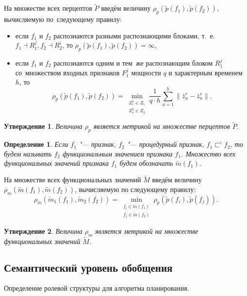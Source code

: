 \documentclass[a4paper, 12pt]{article}
\theoremstyle{plain}
\newtheorem{Pred}{Утверждение}
\newtheorem{Def}{Определение}
\begin{document}
		На множестве всех перцептов $\tilde P$ введём величину $\rho_p(\tilde p(f_1),\tilde p(f_2))$, вычисляемую по~следующему правилу:
		\begin{itemize}
			\item если $f_1$ и $f_2$ распознаются разными распознающими блоками, т.~е. $f_1\dashv R_1^j, f_2\dashv R_2^i$, то $\rho_p(\tilde p(f_1),\tilde p(f_2))=\infty$,
			\item если $f_1$ и $f_2$ распознаются одним и тем~же распознающим блоком $R_1^j$ со~множеством входных признаков $F_1^j$ мощности $q$ и характерным временем $h$, то
			\begin{equation}
				\rho_p(\tilde p(f_1),\tilde p(f_2))=\min\limits_{\substack{Z_r^1\in Z_1\\Z_s^2\in Z_2}}\frac{1}{q\cdot h}\sum\limits_{u=1}^h\|\bar z_u^r-\bar z_u^s\|.
			\end{equation} 
		\end{itemize}
		
		\begin{Pred}
			Величина $\rho_p$ является метрикой на множестве перцептов $\tilde P$.
		\end{Pred}
		
		\begin{Def}
			Если $f_1$ "--- признак, $f_2$ "--- процедурный признак, $f_1\sqsubset^c f_2$, то будем называть $f_2$ функциональным значением признака $f_1$. Множество всех функциональных значений признака $f_1$ будем обозначать $\tilde m(f_1)$.
		\end{Def}
		
		На множестве всех функциональных значений $\tilde M$ введём величину $\rho_m(\tilde m(f_1),\tilde m(f_2))$, вычисляемую по следующему правилу:
		\begin{equation}
			\rho_m(\tilde m_1(f_1),\tilde m_2(f_2 ))=\min\limits_{\substack{f_i\in\tilde m(f_1 )\\f_j\in\tilde m(f_2 )}}\rho_p(\tilde p(f_i ),\tilde p(f_j )).
		\end{equation}
		
		\begin{Pred}
			Величина $\rho_m$ является метрикой на множестве функциональных значений $\tilde M$.
		\end{Pred}
		
	\subsection{Семантический уровень обобщения} Определение ролевой структуры для алгоритма планирования.
	
\end{document}
